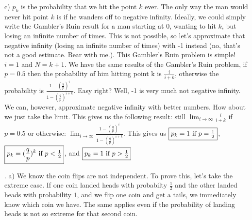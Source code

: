 \documentclass[11pt]{article}
\begin{document}
    c) $p_k$ is the probability that we hit the point $k$ ever.  The only way the man would never hit point $k$ is if he wanders off to negative infinity.  Ideally, we could simply write the Gambler's Ruin result for a man starting at 0, wanting to hit $k$, but losing an infinite number of times. This is not possible, so let's approximate that negative infinity (losing an infinite number of times) with -1 instead (no, that's not a good estimate. Bear with me.).  This Gambler's Ruin problem is simple! $i=1$ and $N=k+1$.  We have the same results of the Gambler's Ruin problem, if $p=0.5$ then the probability of him hitting point k is $\frac{i}{i+k}$, otherwise the probability is $\frac{1-(\frac{q}{p})^i}{1-(\frac{q}{p})^{i+k}}$.  Easy right? Well, -1 is very much not negative infinity.  We can, however, approximate negative infinity with better numbers.  How about we just take the limit.  This gives us the following result: still $\displaystyle \lim_{i \rightarrow \infty}\frac{i}{i+k}$ if $p=0.5$ or otherwise: $\displaystyle \lim_{i \rightarrow \infty}\frac{1-(\frac{q}{p})^i}{1-(\frac{q}{p})^{i+k}}$.  This gives us $\boxed{p_k = 1$ if $p=\frac{1}{2}}$,  $\boxed{p_k = (\frac{q}{p})^k$ if $p<\frac{1}{2}}$, and $\boxed{p_k = 1$ if $p>\frac{1}{2}}$


\bigskip

.
\smallskip	
	a) We know the coin flips are not independent.  To prove this, let's take the extreme case.  If one coin landed heads with probabilty $\frac{1}{2}$ and the other landed heads with probability $1$, and we flip one coin and get a tails, we immediately know which coin we have.  The same applies even if the probability of landing heads is not so extreme for that second coin.  
\bigskip
\end{document}
